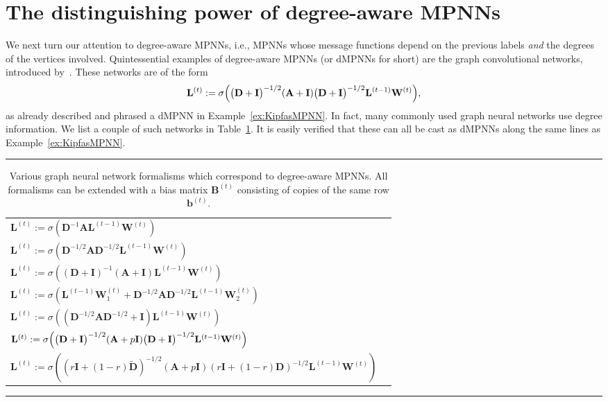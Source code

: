\section{The distinguishing power of degree-aware MPNNs}\label{sec:dMPNNs}
We next turn our attention to degree-aware MPNNs, i.e., MPNNs whose message functions depend on the previous labels \textit{and} the degrees of the vertices involved.
Quintessential examples of degree-aware MPNNs (or dMPNNs for short) are the graph convolutional networks, introduced by~\cite{kipf-loose}. These networks are of the form
$$
\mathbf{L}^{(t)}:=\sigma\Bigl(\bigl(\mathbf{D}+\mathbf{I}\bigr)^{-1/2} (\mathbf{A}+\mathbf{I})\bigl(\mathbf{D}+\mathbf{I}\bigr)^{-1/2} \mathbf{L}^{(t-1)}\mathbf{W}^{(t)}\Bigr),
$$
as already described and phrased a dMPNN in Example~\ref{ex:KipfasMPNN}. In fact, many commonly used graph neural networks use degree information. We list a couple of such networks in Table~\ref{tab:dMPNNs}. It is easily verified that these can all be cast as dMPNNs along the same lines as Example~\ref{ex:KipfasMPNN}.

\begin{table}[]
\hrule
\hspace*{1ex}
 \caption{Various graph neural network formalisms which correspond to degree-aware MPNNs. All formalisms can be extended with a bias matrix $\mathbf{B}^{(t)}$ consisting of copies of the same row $\mathbf{b}^{(t)}$.}
    \label{tab:dMPNNs}
    \centering
    \begin{tabular}{ll}
 $\mathbf{L}^{(t)}:=\sigma\left(\mathbf{D}^{-1}\mathbf{A}\mathbf{L}^{(t-1)}\mathbf{W}^{(t)}\right)$ &\cite{} \\
$
\mathbf{L}^{(t)}:=\sigma\left(\mathbf{D}^{-1/2}\mathbf{A}\mathbf{D}^{-1/2}\mathbf{L}^{(t-1)}\mathbf{W}^{(t)}\right)$&\cite{} \\
$
\mathbf{L}^{(t)}:=\sigma\left((\mathbf{D}+\mathbf{I})^{-1}(\mathbf{A}+\mathbf{I})\mathbf{L}^{(t-1)}\mathbf{W}^{(t)}\right)$&\cite{} \\
$\mathbf{L}^{(t)}:=\sigma\left(\mathbf{L}^{(t-1)}\mathbf{W}_1^{(t)}+\mathbf{D}^{-1/2}\mathbf{A}\mathbf{D}^{-1/2}\mathbf{L}^{(t-1)}\mathbf{W}_2^{(t)}\right)$&\cite{} \\
$
\mathbf{L}^{(t)}:=\sigma\left((\mathbf{D}^{-1/2}\mathbf{A}\mathbf{D}^{-1/2}+\mathbf{I})\mathbf{L}^{(t-1)}\mathbf{W}^{(t)}\right)$ &\cite{} \\
$
\mathbf{L}^{(t)}:=\sigma\Bigl(\bigl(\mathbf{D}+\mathbf{I}\bigr)^{-1/2} (\mathbf{A}+p\mathbf{I})\bigl(\mathbf{D}+\mathbf{I}\bigr)^{-1/2} \mathbf{L}^{(t-1)}\mathbf{W}^{(t)}\Bigr)
$& \cite{kipf-loose} \\
$\mathbf{L}^{(t)}:=\sigma\left((r\mathbf{I}+(1-r)\tilde{\mathbf{D}})^{-1/2}(\mathbf{A}+p\mathbf{I})(r\mathbf{I}+(1-r)\mathbf{D})^{-1/2}\mathbf{L}^{(t-1)}\mathbf{W}^{(t)}\right)$ & \cite{DBLP:journals/corr/abs-1905-03046} 
    \end{tabular}
\hspace*{1ex}
\hrule
\end{table}

